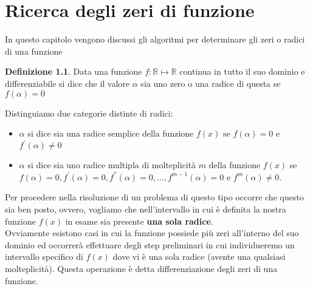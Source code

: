 \documentclass[12pt, a4paper]{book}
\theoremstyle{definition}
\newtheorem{defn}{Definizione}[section]
\begin{document}
\chapter{Ricerca degli zeri di funzione}
\begin{flushleft}

In questo capitolo vengono discussi gli algoritmi per determinare gli zeri o radici di una funzione 
\begin{defn}
Data una funzione $f: \mathbb{R} \mapsto \mathbb{R} $ continua in tutto il suo dominio e differenziabile si dice che il valore $\alpha$ sia uno zero o una radice di questa se $f(\alpha) = 0$

\begin{figure}[h!]
\centering
{}
\end{figure}
\end{defn}

Distinguiamo due categorie distinte di radici: 
\begin{itemize}
	\item $\alpha$ si dice sia una radice semplice della funzione $f(x)$ se $f(\alpha) = 0$ e $f^{'}(\alpha) \neq 0$ 
	\item $\alpha$ si dice sia uno radice multipla di molteplicità $m$ della funzione $f(x)$ se $f(\alpha) = 0,  f^{'}(\alpha) = 0, f^{''}(\alpha) = 0, \dots,  f^{m-1}(\alpha) = 0 $ e $f^{m}(\alpha) \neq 0$.
\end{itemize}

Per procedere nella risoluzione di un problema di questo tipo occorre che questo sia ben posto, ovvero, vogliamo che nell'intervallo in cui è definita la nostra funzione $f(x)$ in esame sia presente \textbf{una sola radice}. \\
Ovviamente esistono casi in cui la funzione possiede più zeri all'interno del suo dominio ed occorrerà effettuare degli step preliminari in cui individueremo un intervallo specifico di $f(x)$ dove vi è una sola radice (avente una qualsiasi molteplicità).
Questa operazione è detta differenziazione degli zeri di una funzione.

\begin{figure}[!h]
\centering
\begin{tikzpicture}


\end{tikzpicture}
\end{figure}
\end{flushleft}
\end{document}
